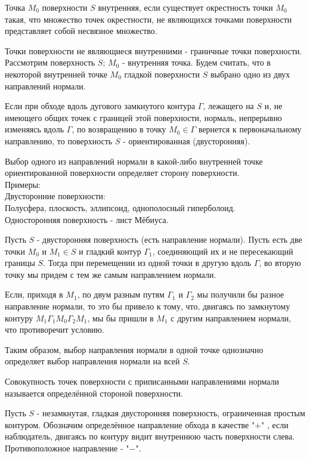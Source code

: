 \opred

Точка $M_0$ поверхности $S$ внутренняя, если существует окрестность точки $M_0$ такая, что множество точек окрестности, не являющихся точками поверхности представляет собой несвязное множество.

\opred

Точки поверхности не являющиеся внутренними - граничные точки поверхности.
\\
Рассмотрим поверхность $S$; $M_0$ - внутренняя точка. Будем считать, что в некоторой внутренней точке $M_0$ гладкой поверхности $S$ выбрано одно из двух направлений нормали.

\opred

Если при обходе вдоль дугового замкнутого контура $\Gamma$, лежащего на $S$ и, не имеющего общих точек с границей этой поверхности, нормаль, непрерывно изменяясь вдоль $\Gamma$, по возвращению в точку $M_0 \in \Gamma$ вернется к первоначальному направлению, то поверхность $S$ - ориентированная (двусторонняя).

Выбор одного из направлений нормали в какой-либо внутренней точке ориентированной поверхности определяет сторону поверхности.
\\
Примеры:
\\
Двусторонние поверхности:
\\
Полусфера, плоскость, эллипсоид, однополосный гиперболоид.
\\
Односторонняя поверхность - лист Мёбиуса.

Пусть $S$ - двусторонняя поверхность (есть направление нормали). Пусть есть две точки $M_0$ и $M_1 \in S$ и гладкий контур $\Gamma_1$, соединяющий их и не пересекающий границы $S$. Тогда при перемещении из одной точки в другую вдоль $\Gamma$, во вторую точку мы придем с тем же самым направлением нормали.

Если, приходя в $M_1$, по двум разным путям $\Gamma_1$ и $\Gamma_2$ мы получили бы разное направление нормали, то это бы привело к тому, что, двигаясь по замкнутому контуру $M_1 \Gamma_1 M_0 \Gamma_2 M_1$, мы бы пришли в $M_1$ с другим направлением нормали, что противоречит условию.

Таким образом, выбор направления нормали в одной точке однозначно определяет выбор направления нормали на всей $S$. 

\opred

Совокупность точек поверхности с приписанными направлениями нормали называется определённой стороной поверхности.

Пусть $S$ - незамкнутая, гладкая двусторонняя поверхность, ограниченная простым контуром. Обозначим определённое направление обхода в качестве "$+$" , если наблюдатель, двигаясь по контуру видит внутреннюю часть поверхности слева. Противоположное направление - "$-$".

